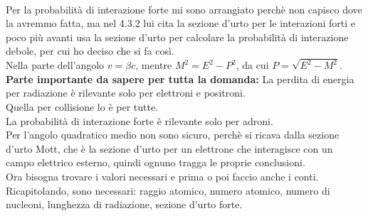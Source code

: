 \documentclass[twoside]{article}
\begin{document}
\\
Per la probabilità di interazione forte mi sono arrangiato perchè non capisco dove la avremmo fatta, ma nel 4.3.2 lui cita la sezione d'urto per le interazioni forti e poco più avanti usa la sezione d'urto per calcolare la probabilità di interazione debole, per cui ho deciso che si fa così.
\\
Nella parte dell'angolo $v=\beta c$, mentre $M^2=E^2-P^2$, da cui $P=\sqrt{E^2-M^2}$.
\\
\textbf{Parte importante da sapere per tutta la domanda:} La perdita di energia per radiazione è rilevante solo per elettroni e positroni.
\\
Quella per collisione lo è per tutte.
\\
La probabilità di interazione forte è rilevante solo per adroni.
\\
Per l'angolo quadratico medio non sono sicuro, perchè si ricava dalla sezione d'urto Mott, che è la sezione d'urto per un elettrone che interagisce con un campo elettrico esterno, quindi ognuno tragga le proprie conclusioni.
\\
Ora bisogna trovare i valori necessari e prima o poi faccio anche i conti.
\\
Ricapitolando, sono necessari: raggio atomico, numero atomico, numero di nucleoni, lunghezza di radiazione, sezione d'urto forte.
\end{document}
